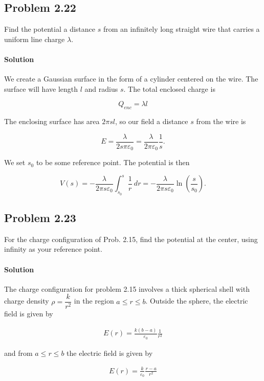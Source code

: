 \documentclass{article}
\begin{document}
\newpage
\subsection*{Problem 2.22}
Find the potential a distance $s$ from an infinitely long straight wire that carries a uniform line charge $\lambda$.

\paragraph{Solution} We create a Gaussian surface in the form of a cylinder centered on the wire. The surface will have length $l$ and radius $s$. The total enclosed charge is 

$$
Q_{enc} = \lambda l
$$

The enclosing surface has area $2\pi sl$, so our field a distance $s$ from the wire is 

$$
E = \frac{\lambda}{2s\pi \varepsilon_0} = \frac{\lambda}{2\pi\varepsilon_0}\frac{1}{s}.
$$

We set $s_0$ to be some reference point. The potential is then 

$$
V(s) = -\frac{\lambda}{2\pi s \varepsilon_0} \int_{s_0}^s \frac{1}{r}\ dr = -\frac{\lambda}{2\pi s \varepsilon_0} \ln(\dfrac{s}{s_0}).
$$

\newpage
\subsection*{Problem 2.23}
For the charge configuration of Prob. 2.15, find the potential at the
center, using infinity as your reference point.

\paragraph{Solution} The charge configuration for problem 2.15 involves a thick spherical shell with charge density $\rho = \dfrac{k}{r^2}$ in the region $a \leq r \leq b$. Outside the sphere, the electric field is given by 

\begin{align*}
    E(r) = \frac{k(b - a)}{\varepsilon_0} \frac{1}{r^2}
\end{align*}

and from $a \leq r \leq b$ the electric field is given by 

\begin{align*}
    E(r) = \frac{k}{\varepsilon_0}\frac{r - a}{r^2}
\end{align*}
\end{document}
